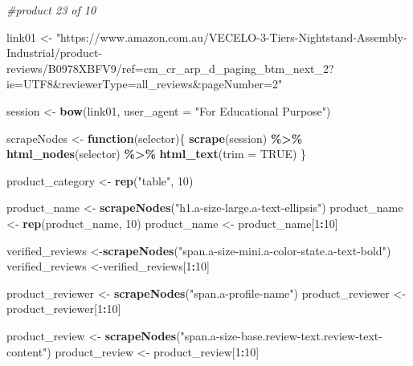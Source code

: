 \documentclass[
]{article}
\newenvironment{Shaded}{\begin{snugshade}}{\end{snugshade}}
\newcommand{\AttributeTok}[1]{\textcolor[rgb]{0.13,0.29,0.53}{#1}}
\newcommand{\CommentTok}[1]{\textcolor[rgb]{0.56,0.35,0.01}{\textit{#1}}}
\newcommand{\ConstantTok}[1]{\textcolor[rgb]{0.56,0.35,0.01}{#1}}
\newcommand{\ControlFlowTok}[1]{\textcolor[rgb]{0.13,0.29,0.53}{\textbf{#1}}}
\newcommand{\DecValTok}[1]{\textcolor[rgb]{0.00,0.00,0.81}{#1}}
\newcommand{\FunctionTok}[1]{\textcolor[rgb]{0.13,0.29,0.53}{\textbf{#1}}}
\newcommand{\NormalTok}[1]{#1}
\newcommand{\OtherTok}[1]{\textcolor[rgb]{0.56,0.35,0.01}{#1}}
\newcommand{\SpecialCharTok}[1]{\textcolor[rgb]{0.81,0.36,0.00}{\textbf{#1}}}
\newcommand{\StringTok}[1]{\textcolor[rgb]{0.31,0.60,0.02}{#1}}
\begin{document}
\begin{Shaded}
\begin{Highlighting}[]
\CommentTok{\#product 23 of 10}

\NormalTok{link01 }\OtherTok{\textless{}{-}} \StringTok{"https://www.amazon.com.au/VECELO{-}3{-}Tiers{-}Nightstand{-}Assembly{-}Industrial/product{-}reviews/B0978XBFV9/ref=cm\_cr\_arp\_d\_paging\_btm\_next\_2?ie=UTF8\&reviewerType=all\_reviews\&pageNumber=2"}


\NormalTok{  session }\OtherTok{\textless{}{-}} \FunctionTok{bow}\NormalTok{(link01,}
               \AttributeTok{user\_agent =} \StringTok{"For Educational Purpose"}\NormalTok{)}

\NormalTok{  scrapeNodes }\OtherTok{\textless{}{-}} \ControlFlowTok{function}\NormalTok{(selector)\{}
    \FunctionTok{scrape}\NormalTok{(session) }\SpecialCharTok{\%\textgreater{}\%}
      \FunctionTok{html\_nodes}\NormalTok{(selector) }\SpecialCharTok{\%\textgreater{}\%}
      \FunctionTok{html\_text}\NormalTok{(}\AttributeTok{trim =} \ConstantTok{TRUE}\NormalTok{)}
\NormalTok{  \}}

\NormalTok{  product\_category }\OtherTok{\textless{}{-}} \FunctionTok{rep}\NormalTok{(}\StringTok{"table"}\NormalTok{, }\DecValTok{10}\NormalTok{)}

\NormalTok{  product\_name }\OtherTok{\textless{}{-}} \FunctionTok{scrapeNodes}\NormalTok{(}\StringTok{"h1.a{-}size{-}large.a{-}text{-}ellipsis"}\NormalTok{)}
\NormalTok{  product\_name }\OtherTok{\textless{}{-}} \FunctionTok{rep}\NormalTok{(product\_name, }\DecValTok{10}\NormalTok{)}
\NormalTok{  product\_name }\OtherTok{\textless{}{-}}\NormalTok{ product\_name[}\DecValTok{1}\SpecialCharTok{:}\DecValTok{10}\NormalTok{]}
  
\NormalTok{  verified\_reviews }\OtherTok{\textless{}{-}}\FunctionTok{scrapeNodes}\NormalTok{(}\StringTok{"span.a{-}size{-}mini.a{-}color{-}state.a{-}text{-}bold"}\NormalTok{)}
\NormalTok{  verified\_reviews }\OtherTok{\textless{}{-}}\NormalTok{verified\_reviews[}\DecValTok{1}\SpecialCharTok{:}\DecValTok{10}\NormalTok{]}
  
\NormalTok{  product\_reviewer }\OtherTok{\textless{}{-}} \FunctionTok{scrapeNodes}\NormalTok{(}\StringTok{"span.a{-}profile{-}name"}\NormalTok{)}
\NormalTok{  product\_reviewer }\OtherTok{\textless{}{-}}\NormalTok{ product\_reviewer[}\DecValTok{1}\SpecialCharTok{:}\DecValTok{10}\NormalTok{]}
  
\NormalTok{  product\_review }\OtherTok{\textless{}{-}} \FunctionTok{scrapeNodes}\NormalTok{(}\StringTok{"span.a{-}size{-}base.review{-}text.review{-}text{-}content"}\NormalTok{)}
\NormalTok{  product\_review }\OtherTok{\textless{}{-}}\NormalTok{ product\_review[}\DecValTok{1}\SpecialCharTok{:}\DecValTok{10}\NormalTok{]}
  

\end{Highlighting}
\end{Shaded}
\end{document}
